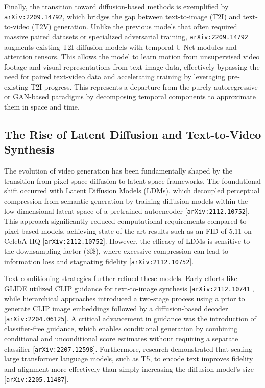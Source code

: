 \documentclass[11pt]{article}
\begin{document}
Finally, the transition toward diffusion-based methods is exemplified by \texttt{arXiv:2209.14792}, which bridges the gap between text-to-image (T2I) and text-to-video (T2V) generation. Unlike the previous models that often required massive paired datasets or specialized adversarial training, \texttt{arXiv:2209.14792} augments existing T2I diffusion models with temporal U-Net modules and attention tensors. This allows the model to learn motion from unsupervised video footage and visual representations from text-image data, effectively bypassing the need for paired text-video data and accelerating training by leveraging pre-existing T2I progress. This represents a departure from the purely autoregressive or GAN-based paradigms by decomposing temporal components to approximate them in space and time.

\subsection{The Rise of Latent Diffusion and Text-to-Video Synthesis}

The evolution of video generation has been fundamentally shaped by the transition from pixel-space diffusion to latent-space frameworks. The foundational shift occurred with Latent Diffusion Models (LDMs), which decoupled perceptual compression from semantic generation by training diffusion models within the low-dimensional latent space of a pretrained autoencoder [\texttt{arXiv:2112.10752}]. This approach significantly reduced computational requirements compared to pixel-based models, achieving state-of-the-art results such as an FID of 5.11 on CelebA-HQ [\texttt{arXiv:2112.10752}]. However, the efficacy of LDMs is sensitive to the downsampling factor (\$f\$), where excessive compression can lead to information loss and stagnating fidelity [\texttt{arXiv:2112.10752}].

Text-conditioning strategies further refined these models. Early efforts like GLIDE utilized CLIP guidance for text-to-image synthesis [\texttt{arXiv:2112.10741}], while hierarchical approaches introduced a two-stage process using a prior to generate CLIP image embeddings followed by a diffusion-based decoder [\texttt{arXiv:2204.06125}]. A critical advancement in guidance was the introduction of classifier-free guidance, which enables conditional generation by combining conditional and unconditional score estimates without requiring a separate classifier [\texttt{arXiv:2207.12598}]. Furthermore, research demonstrated that scaling large transformer language models, such as T5, to encode text improves fidelity and alignment more effectively than simply increasing the diffusion model's size [\texttt{arXiv:2205.11487}].
\end{document}
